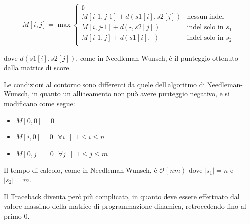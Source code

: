 \begin{equation}
    M[i, j] = \max  {
                    \begin{cases} 
                        0\\
                        M[i \textrm{-} 1,j \textrm{-} 1] +d(s1[i],s2[j]) & \textrm{nessun indel}\\
                        M[i,j \textrm{-} 1] +d(\textrm{-},s2[j]) & \textrm{indel solo in } s_1\\
                        M[i \textrm{-} 1,j] +d(s1[i],\textrm{-}) & \textrm{indel solo in } s_2\\
                    \end{cases}
                    }
\end{equation}

dove $d(s1[i],s2[j])$, come in Needleman-Wunsch, è il punteggio ottenuto dalla matrice di score.

Le condizioni al contorno sono differenti da quele dell'algoritmo di Needleman-Wunsch, in quanto un allineamento non può avere punteggio negativo, e si modificano come segue:

\begin{itemize}
    \item $M[0,0]=0$
    \item $M[i,0]=0 \textrm{ } \forall i \textrm{ } | \textrm{ } 1\leqslant i \leqslant n$
    \item $M[0,j]=0 \textrm{ } \forall j \textrm{ }| \textrm{ } 1\leqslant j \leqslant m$
\end{itemize}

Il tempo di calcolo, come in Needleman-Wunsch, è $\mathcal{O}(nm)$ dove $|s_1|=n$ e $|s_2|=m$.

Il Traceback diventa però più complicato, in quanto deve essere effettuato dal valore massimo della matrice di programmazione dinamica, retrocedendo fino al primo 0.

